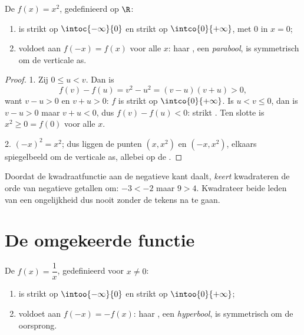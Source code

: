 \begin{proposition}[Kwadraatfunctie]\label{prop:g10:reffunc:square}
De  $f(x) = x^2$, gedefinieerd op $\R$:
\begin{enumerate}
  \item is strikt  op $\intoc{-\infty}{0}$ en strikt  op
        $\intco{0}{+\infty}$, met  $0$ in $x = 0$;
  \item voldoet aan $f(-x) = f(x)$ voor alle $x$: haar , een
        \emph{parabool}, is symmetrisch om de verticale as.
\end{enumerate}
\end{proposition}

\begin{proof}
1. Zij $0 \leq u < v$. Dan is
\[
f(v) - f(u) = v^2 - u^2 = (v - u)(v + u) > 0,
\]
want $v - u > 0$ en $v + u > 0$: $f$ is strikt  op
$\intco{0}{+\infty}$. Is $u < v \leq 0$, dan is $v - u > 0$ maar
$v + u < 0$, dus $f(v) - f(u) < 0$: strikt . Ten slotte is
$x^2 \geq 0 = f(0)$ voor alle $x$.

2. $(-x)^2 = x^2$; dus liggen de punten $(x, x^2)$ en $(-x, x^2)$, elkaars
spiegelbeeld om de verticale as, allebei op de .
\end{proof}

\begin{remark}
Doordat de kwadraatfunctie aan de negatieve kant daalt, \emph{keert}
kwadrateren de orde van negatieve getallen om: $-3 < -2$ maar $9 > 4$.
Kwadrateer beide leden van een ongelijkheid dus nooit zonder de tekens na te
gaan.
\end{remark}

\section{De omgekeerde functie}

\begin{proposition}\label{prop:g10:reffunc:inverse}
De  $f(x) = \dfrac1x$, gedefinieerd voor $x \neq 0$:
\begin{enumerate}
  \item is strikt  op $\intoo{-\infty}{0}$ en strikt  op
        $\intoo{0}{+\infty}$;
  \item voldoet aan $f(-x) = -f(x)$: haar , een
        \emph{hyperbool}, is symmetrisch om de oorsprong.
\end{enumerate}
\end{proposition}

